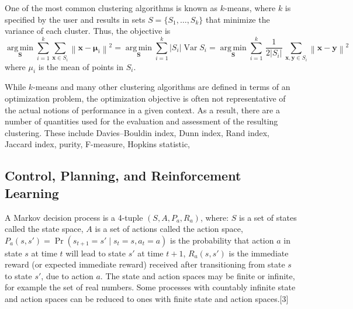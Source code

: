 One of the most common clustering algorithms is known as $k$-means, where $k$ is specified by the user and results in sets $S = \{S_1, \dots, S_k\}$
that minimize the variance of each cluster. Thus, the objective is
\begin{equation}
    \label{ML:eq:kmeans1}    
{\displaystyle {\underset {\mathbf {S} }{\operatorname {arg\,min} }}\sum _{i=1}^{k}\sum _{\mathbf {x} \in S_{i}}\left\|\mathbf {x} -{\boldsymbol {\mu }}_{i}\right\|^{2}={\underset {\mathbf {S} }{\operatorname {arg\,min} }}\sum _{i=1}^{k}|S_{i}|\operatorname {Var} S_{i}} = {\displaystyle {\underset {\mathbf {S} }{\operatorname {arg\,min} }}\sum _{i=1}^{k}\,{\frac {1}{2|S_{i}|}}\,\sum _{\mathbf {x} ,\mathbf {y} \in S_{i}}\left\|\mathbf {x} -\mathbf {y} \right\|^{2}}
\end{equation}
where $\mu_i$ is the mean of points in $S_i$. 
\label{ML:eq:kmeans2}

While $k$-means and many other clustering algorithms are defined in terms of an optimization problem, the optimization objective is often not representative of the actual notions of performance in a given context. As a result, there are a number of quantities used for the evaluation and assessment of the resulting clustering. These include Davies–Bouldin index, Dunn index, Rand index, Jaccard index, purity, F-measure, Hopkins statistic, \etc~\cite{wikipedia-clustering} 

\subsection{Control, Planning, and Reinforcement Learning}\label{ML:sec:RL}


A Markov decision process is a 4-tuple 
${\displaystyle (S,A,P_{a},R_{a})}$, where:
$S$ is a set of states called the state space, $A$ is a set of actions called the action space, ${\displaystyle P_{a}(s,s')=\Pr(s_{t+1}=s'\mid s_{t}=s,a_{t}=a)}$ is the probability that action 
$a$ in state $s$ at time $t$ will lead to state 
$s'$ at time $t+1$, ${\displaystyle R_{a}(s,s')}$ is the immediate reward (or expected immediate reward) received after transitioning from state 
$s$ to state 
$s'$, due to action $a$. 
The state and action spaces may be finite or infinite, for example the set of real numbers. Some processes with countably infinite state and action spaces can be reduced to ones with finite state and action spaces.[3]

